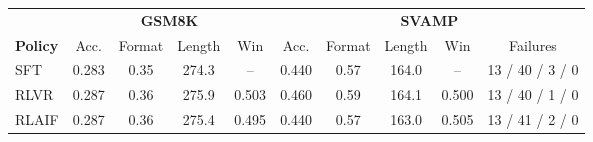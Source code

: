 \begin{tabular}{l cccc ccccc}
  \toprule
  & \multicolumn{4}{c}{\textbf{GSM8K}} & \multicolumn{5}{c}{\textbf{SVAMP}} \\
  \cmidrule(lr){2-5}\cmidrule(lr){6-10}
  \textbf{Policy} & Acc. & Format & Length & Win & Acc. & Format & Length & Win & Failures \\
  \midrule
    SFT & 0.283 & 0.35 & 274.3 & -- & 0.440 & 0.57 & 164.0 & -- & 13 / 40 / 3 / 0 \\
    RLVR & 0.287 & 0.36 & 275.9 & 0.503 & 0.460 & 0.59 & 164.1 & 0.500 & 13 / 40 / 1 / 0 \\
    RLAIF & 0.287 & 0.36 & 275.4 & 0.495 & 0.440 & 0.57 & 163.0 & 0.505 & 13 / 41 / 2 / 0 \\
  \bottomrule
\end{tabular}
